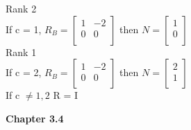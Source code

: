 \documentclass[10pt,twoside,reqno]{article}
\begin{document}
\begin{enumerate}
\begin{center}
\vspace{2mm}
Rank 2\\
\vspace{3mm}
If c = 1,
$
$$
R_B =
\begin{bmatrix}
1&-2\\
0&0\\
\end{bmatrix}
$$
$
then
$
$$
N =
\begin{bmatrix}
1\\
0\\
\end{bmatrix}
$$
$\\
\vspace{2mm}
Rank 1\\
\vspace{3mm}
If c = 2,
$
$$
R_B =
\begin{bmatrix}
1&-2\\
0&0\\
\end{bmatrix}
$$
$
then
$
$$
N =
\begin{bmatrix}
2\\
1\\
\end{bmatrix}
$$
$\\
\vspace{2mm}
If c $\neq 1, 2$ R = I\\
\vspace{3mm}
\end{center}

\end{enumerate}
\vspace{5mm}
\textbf{Chapter 3.4}
\end{document}
